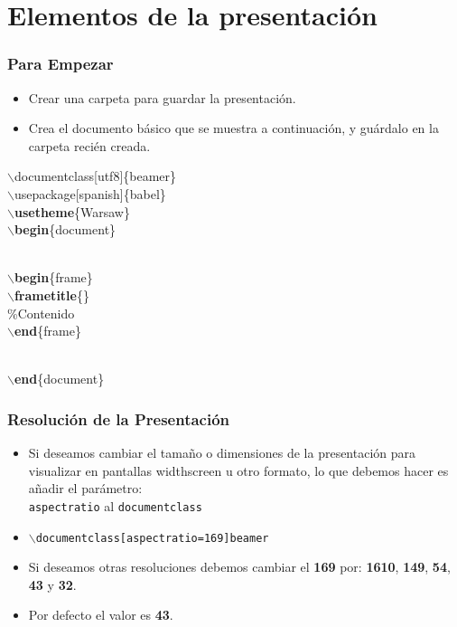 \documentclass[aspectratio=43]{beamer}%
\newcommand\azul[1]{\textcolor[RGB]{19,15,204}{#1}}
\newcommand\verde[1]{\textcolor[RGB]{5,101,99}{#1}}
\begin{document}
\section{Elementos de la presentación}
\begin{frame}[fragile]
\frametitle{\textbf{Para Empezar}}
\justifying
 \begin{itemize}\justifying
  \item Crear una carpeta para guardar la presentación.
  \item Crea el documento básico que se muestra a continuación, y guárdalo en la carpeta recién creada.
\end{itemize}

$\backslash$\azul{documentclass}[utf8]\{beamer\}\\
$\backslash$\azul{usepackage}[spanish]\{babel\}\\
$\backslash$\textbf{usetheme}\{Warsaw\}\\
$\backslash$\textbf{begin}\{document\}\\\

$\backslash$\textbf{begin}\{frame\}\\
$\backslash$\textbf{frametitle}\{\}\\
\verde{\%Contenido}\\
$\backslash$\textbf{end}\{frame\}\\\

$\backslash$\textbf{end}\{document\}\\
\end{frame}

\begin{frame}[fragile]
\frametitle{\textbf{Resolución de la Presentación}}
\justifying
\begin{itemize}\justifying
  \item  Si deseamos cambiar el tamaño o dimensiones de la presentación para visualizar en pantallas widthscreen u otro formato, lo que debemos hacer es añadir el parámetro:\\ \texttt{aspectratio} al \texttt{documentclass}
  \item \texttt{$\backslash$documentclass[aspectratio=169]{beamer}}
  \item Si deseamos otras resoluciones debemos cambiar el \textbf{169} por: \textbf{1610}, \textbf{149}, \textbf{54}, \textbf{43} y \textbf{32}.
  \item Por defecto el valor es \textbf{43}.
\end{itemize}

\end{frame}
\end{document}
